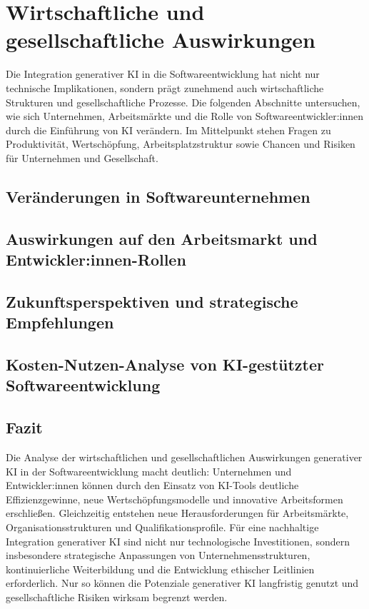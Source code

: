 \chapter{Wirtschaftliche und gesellschaftliche Auswirkungen}
\label{chap:wirtschaftliche_und_gesellschaftliche_auswirkungen}
Die Integration generativer KI in die Softwareentwicklung hat nicht nur technische Implikationen, sondern prägt zunehmend auch wirtschaftliche Strukturen und gesellschaftliche Prozesse. Die folgenden Abschnitte untersuchen, wie sich Unternehmen, Arbeitsmärkte und die Rolle von Softwareentwickler:innen durch die Einführung von KI verändern. Im Mittelpunkt stehen Fragen zu Produktivität, Wertschöpfung, Arbeitsplatzstruktur sowie Chancen und Risiken für Unternehmen und Gesellschaft.

\section{Veränderungen in Softwareunternehmen}


\section{Auswirkungen auf den Arbeitsmarkt und Entwickler:innen-Rollen}


\section{Zukunftsperspektiven und strategische Empfehlungen}


\section{Kosten-Nutzen-Analyse von KI-gestützter Softwareentwicklung}


\section{Fazit}

Die Analyse der wirtschaftlichen und gesellschaftlichen Auswirkungen
generativer KI in der Softwareentwicklung macht deutlich: Unternehmen und
Entwickler:innen können durch den Einsatz von KI-Tools deutliche
Effizienzgewinne, neue Wertschöpfungsmodelle und innovative Arbeitsformen
erschließen. Gleichzeitig entstehen neue Herausforderungen für Arbeitsmärkte,
Organisationsstrukturen und Qualifikationsprofile. Für eine nachhaltige
Integration generativer KI sind nicht nur technologische Investitionen, sondern
insbesondere strategische Anpassungen von Unternehmensstrukturen,
kontinuierliche Weiterbildung und die Entwicklung ethischer Leitlinien
erforderlich. Nur so können die Potenziale generativer KI langfristig genutzt
und gesellschaftliche Risiken wirksam begrenzt werden.

